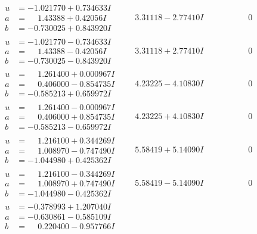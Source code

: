 \documentclass[1p]{elsarticle_modified}
\theoremstyle{definition}
\begin{document}
$$\begin{array}{c|c|c}
\begin{aligned}
u &= -1.021770 + 0.734633 I \\
a &= \phantom{-}1.43388 + 0.42056 I \\
b &= -0.730025 + 0.843920 I\end{aligned}
 & \phantom{-}3.31118 - 2.77410 I & \phantom{-0.000000 } 0 \\ \hline\begin{aligned}
u &= -1.021770 - 0.734633 I \\
a &= \phantom{-}1.43388 - 0.42056 I \\
b &= -0.730025 - 0.843920 I\end{aligned}
 & \phantom{-}3.31118 + 2.77410 I & \phantom{-0.000000 } 0 \\ \hline\begin{aligned}
u &= \phantom{-}1.261400 + 0.000967 I \\
a &= \phantom{-}0.406000 - 0.854735 I \\
b &= -0.585213 + 0.659972 I\end{aligned}
 & \phantom{-}4.23225 - 4.10830 I & \phantom{-0.000000 } 0 \\ \hline\begin{aligned}
u &= \phantom{-}1.261400 - 0.000967 I \\
a &= \phantom{-}0.406000 + 0.854735 I \\
b &= -0.585213 - 0.659972 I\end{aligned}
 & \phantom{-}4.23225 + 4.10830 I & \phantom{-0.000000 } 0 \\ \hline\begin{aligned}
u &= \phantom{-}1.216100 + 0.344269 I \\
a &= \phantom{-}1.008970 - 0.747490 I \\
b &= -1.044980 + 0.425362 I\end{aligned}
 & \phantom{-}5.58419 + 5.14090 I & \phantom{-0.000000 } 0 \\ \hline\begin{aligned}
u &= \phantom{-}1.216100 - 0.344269 I \\
a &= \phantom{-}1.008970 + 0.747490 I \\
b &= -1.044980 - 0.425362 I\end{aligned}
 & \phantom{-}5.58419 - 5.14090 I & \phantom{-0.000000 } 0 \\ \hline\begin{aligned}
u &= -0.378993 + 1.207040 I \\
a &= -0.630861 - 0.585109 I \\
b &= \phantom{-}0.220400 - 0.957766 I\end{aligned}

\end{array}$$
\end{document}
